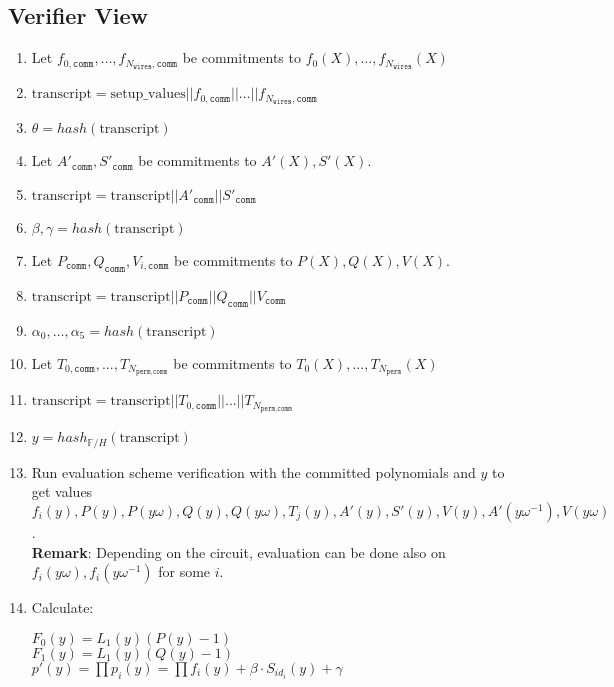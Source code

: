 \subsection{Verifier View}

\begin{enumerate}
	\item Let $f_{0, \texttt{comm}}, \dots, f_{N_{\texttt{wires}}, \texttt{comm}}$ be commitments to $f_{0}(X), \dots, f_{N_{\texttt{wires}}}(X)$
	\item $\text{transcript} = \text{setup\_values} || f_{0, \texttt{comm}} || \dots || f_{N_{\texttt{wires}}, \texttt{comm}}$
	\item $\theta = hash(\text{transcript})$
	\item Let $A'_{\texttt{comm}}, S'_{\texttt{comm}}$ be commitments to $A'(X), S'(X)$.
	\item $\text{transcript} = \text{transcript} || A'_{\texttt{comm}} || S'_{\texttt{comm}}$ 
	\item $\beta, \gamma = hash(\text{transcript})$
	\item Let $P_{\texttt{comm}}, Q_{\texttt{comm}}, V_{i, \texttt{comm}}$ be commitments to $P(X), Q(X), V(X)$.
	\item $\text{transcript} = \text{transcript} || P_{\texttt{comm}} || Q_{\texttt{comm}} || V_{\texttt{comm}}$
	\item $\alpha_0, \dots, \alpha_5 = hash(\text{transcript})$
	\item Let $T_{0, \texttt{comm}}, ..., T_{N_{\texttt{perm}, \texttt{comm}}}$ be commitments to $T_0(X), ..., T_{N_{\texttt{perm}}}(X)$ 
	\item $\text{transcript} = \text{transcript} || T_{0, \texttt{comm}} || ... || T_{N_{\texttt{perm}, \texttt{comm}}}$
	\item $y = hash_{\mathbb{F}/H}(\text{transcript})$
	\item Run evaluation scheme verification with the committed polynomials and $y$ to get values 
		$f_i(y), P(y), P(y\omega), Q(y), Q(y\omega), T_j(y), A'(y), S'(y), V(y), A'(y\omega^{-1}), V(y\omega)$.  \\
		\textbf{Remark}: Depending on the circuit, evaluation can be done also on $f_i(y\omega), f_i(y\omega^{-1})$ for some $i$.
	\item Calculate:
	\begin{center}
		$F_0(y) = L_1(y)(P(y) - 1)$ \\
		$F_1(y) = L_1(y)(Q(y) - 1)$ \\
		$p'(y) = \prod p_i(y) = \prod f_i(y) + \beta \cdot S_{id_i}(y) + \gamma$ \\

\end{center}
\end{enumerate}
